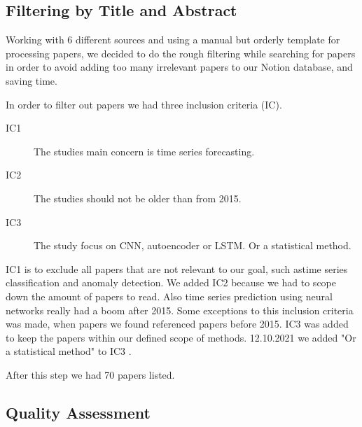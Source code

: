 \subsection{Filtering by Title and Abstract}
Working with 6 different sources and using a manual but orderly template for processing papers,
we decided to do the rough filtering while searching for papers in order to avoid adding too many irrelevant
papers to our Notion database, and saving time.

In order to filter out papers we had three inclusion criteria (IC).
\begin{description}
    \item[IC1] The studies main concern is time series forecasting.
    \item[IC2] The studies should not be older than from 2015.
    \item[IC3] The study focus on CNN, autoencoder or LSTM. Or a statistical method.
\end{description}
IC1 is to exclude all papers that are not relevant to our goal, such astime series classification and anomaly detection.
We added IC2 because we had to scope down the amount of papers to read. Also time series prediction 
using neural networks really had a boom after 2015. Some exceptions to this inclusion criteria was made,
when papers we found referenced papers before 2015.
IC3 was added to keep the papers within our defined scope of methods. 12.10.2021 we added "Or a statistical method"
to IC3 \citep{decisionmatrix}.

After this step we had 70 papers listed.

\subsection{Quality Assessment}
